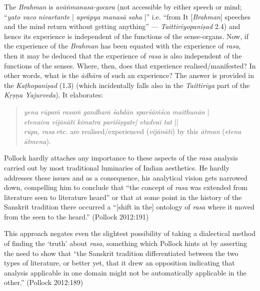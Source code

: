 The \textsl{Brahman} is \textsl{avāṅmanasa-gocara} (not accessible by either speech or mind; “\textsl{yato vaco nivartante} | \textsl{aprāpya manasā saha} |” i.e. “from It [\textsl{Brahman}] speeches and the mind return without getting anything” --- \textsl{Taittirīyopaniṣad} 2.4) and hence its experience is independent of the functions of the sense-organs. Now, if the experience of the \textsl{Brahman} has been equated with the experience of \textsl{rasa}, then it may be deduced that the experience of \textsl{rasa} is also independent of the functions of the senses. Where, then, does that experience realised/manifested? In other words, what is the \textsl{ādhāra} of such an experience? The answer is provided in the \textsl{Kaṭhopaniṣad} (1.3) (which incidentally falls also in the \textsl{Taittirīya} part of the \textsl{Kṛṣṇa Yajurveda}). It elaborates:
\begin{quote}
\textsl{yena rūpaṁ rasaṁ gandhaṁ śabdān sparśāṁśca maithunān} |\\
\textsl{etenaiva vijānāti kimatra pariśiṣyate| etadvai tat} ||\\
\textsl{rūpa,} \textsl{rasa} etc. are realised/experienced (\textsl{vijānāti}) by this \textsl{ātman} (\textsl{etena ātmena}). 
\end{quote}

Pollock hardly attaches any importance to these aspects of the \textsl{rasa} analysis carried out by most traditional luminaries of Indian aesthetics. He hardly addresses these issues and as a consequence, his analytical vision gets narrowed down, compelling him to conclude that “the concept of \textsl{rasa} was extended from literature seen to literature heard” or that at some point in the history of the Sanskrit tradition there occurred a “[shift in the] ontology of \textsl{rasa} where it moved from the seen to the heard.” (Pollock 2012:191) 

This approach negates even the slightest possibility of taking a dialectical method of finding the ‘truth’ about \textsl{rasa}, something which Pollock hints at by asserting the need to show that “the Sanskrit tradition differentiated between the two types of literature, or better yet, that it drew an opposition indicating that analysis applicable in one domain might not be automatically applicable in the other.” (Pollock 2012:189)\\[-21pt]

